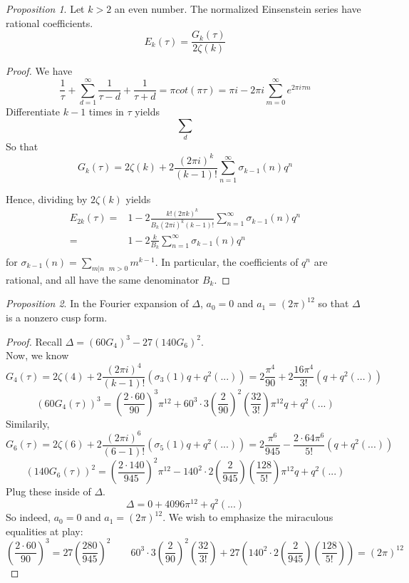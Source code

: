 \documentclass[11pt]{article}
\theoremstyle{definition}
\theoremstyle{example}
\theoremstyle{remark}
\theoremstyle{lemma}
\theoremstyle{proposition}
\newtheorem{proposition}{Proposition}[section]
\theoremstyle{Problem}
\theoremstyle{Solution}
\theoremstyle{theorem}
\theoremstyle{corollary}
\begin{document}
\begin{proposition}
Let $k>2$ an even number. The normalized Einsenstein series have rational coefficients.
$$E_k(\tau) = \frac{G_k(\tau)}{2\zeta(k)}$$
\end{proposition}

\begin{proof}
We have $$\frac{1}{\tau}+\sum_{d=1}^\infty\frac{1}{\tau-d}+\frac{1}{\tau+d} = \pi  cot(\pi\tau) = \pi i - 2\pi i \sum_{m=0}^\infty e^{2\pi i \tau m}$$
Differentiate $k-1$ times in $\tau$ yields
$$\sum_{d}$$ 
So that $$G_k(\tau) = 2\zeta(k) + 2\frac{(2\pi i)^k}{(k-1)!}\sum_{n=1}^\infty \sigma_{k-1}(n)q^n$$

Hence, dividing by $2\zeta(k)$ yields 
\begin{eqnarray*}
E_{2k}(\tau) =& 1 - 2\frac{k!(2\pi k)^k}{B_k(2\pi i)^k(k-1)!}\sum_{n=1}^\infty \sigma_{k-1}(n)q^n\\
=& 1 - 2\frac{k}{B_k}\sum_{n=1}^\infty \sigma_{k-1}(n)q^n\\
\end{eqnarray*}
for $\sigma_{k-1}(n) = \sum_{m|n \text{  } m>0} m^{k-1}$. In particular, the coefficients of $q^n$ are rational, and all have the same denominator $B_k$. 
\end{proof}

\begin{proposition}
In the Fourier expansion of $\Delta$, $a_0=0$ and $a_1=(2\pi)^{12}$ so that $\Delta$ is a nonzero cusp form.
\end{proposition}
\begin{proof}
Recall $\Delta = (60G_4)^3 - 27(140G_6)^2$.\\
Now, we know $$G_4(\tau) = 2\zeta(4) + 2\frac{(2\pi i)^4}{(k-1)!}(\sigma_3(1)q + q^2(...)) = 2\frac{\pi^4}{90} + 2\frac{16\pi^4}{3!}(q+q^2(...))$$
$$(60G_4(\tau))^3 = \left(\frac{2\cdot60}{90}\right)^3 \pi^{12} + 60^3\cdot3\left(\frac{2}{90}\right)^2\left(\frac{32}{3!}\right)\pi^{12}q+q^2(...)$$
Similarily, $$G_6(\tau) = 2\zeta(6)+ 2\frac{(2\pi i)^6}{(6-1)!}(\sigma_5(1)q+q^2(...)) = 2\frac{\pi^6}{945} - \frac{2\cdot64\pi^6}{5!}(q+q^2(...))$$
 $$(140G_6(\tau))^2 = \left(\frac{2\cdot 140}{945}\right)^2\pi^{12} - 140^2\cdot2\left(\frac{2}{945}\right)\left(\frac{128}{5!}\right)\pi^{12}q+q^2(...)$$
Plug these inside of $\Delta$. 
$$\Delta = 0 + 4096\pi^12 + q^2(...)$$
So indeed, $a_0=0$ and $a_1=(2\pi)^{12}$. We wish to emphasize the miraculous equalities at play:
$$\left(\frac{2\cdot60}{90}\right)^3 = 27\left(\frac{280}{945}\right)^2 \qquad 60^3\cdot3\left(\frac{2}{90}\right)^2\left(\frac{32}{3!}\right) + 27\left(140^2\cdot2\left(\frac{2}{945}\right)\left(\frac{128}{5!}\right)\right) = (2\pi)^{12}$$
\end{proof}
\end{document}
